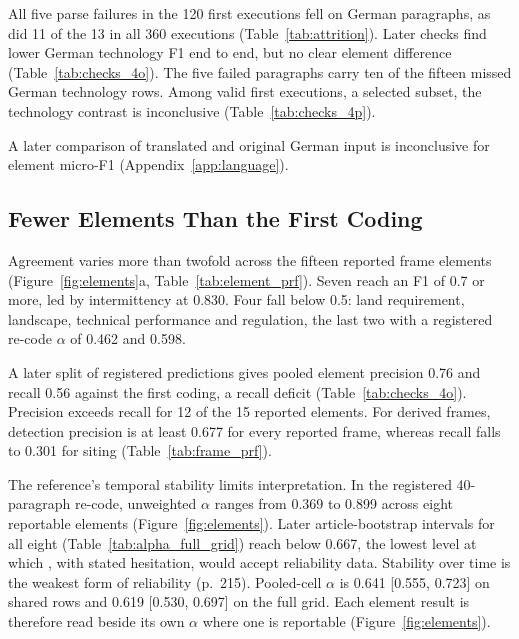 All five parse failures in the 120 first executions fell on German paragraphs, as did 11 of the 13 in all 360 executions (Table~\ref{tab:attrition}). Later checks find lower German technology F1 end to end, but no clear element difference (Table~\ref{tab:checks_4o}). The five failed paragraphs carry ten of the fifteen missed German technology rows. Among valid first executions, a selected subset, the technology contrast is inconclusive (Table~\ref{tab:checks_4p}).

A later comparison of translated and original German input is inconclusive for element micro-F1 (Appendix~\ref{app:language}).

\subsection{Fewer Elements Than the First Coding}\label{subsec:directional}\label{subsubsec:per_element}

Agreement varies more than twofold across the fifteen reported frame elements (Figure~\ref{fig:elements}a, Table~\ref{tab:element_prf}). Seven reach an F1 of 0.7 or more, led by intermittency at 0.830. Four fall below 0.5: land requirement, landscape, technical performance and regulation, the last two with a registered re-code $\alpha$ of 0.462 and 0.598.



\label{subsubsec:error_decomposition}%
A later split of registered predictions gives pooled element precision 0.76 and recall 0.56 against the first coding, a recall deficit (Table~\ref{tab:checks_4o}). Precision exceeds recall for 12 of the 15 reported elements. For derived frames, detection precision is at least 0.677 for every reported frame, whereas recall falls to 0.301 for siting (Table~\ref{tab:frame_prf}).

\label{subsec:reliability_results}%
The reference's temporal stability limits interpretation. In the registered 40-paragraph re-code, unweighted $\alpha$ ranges from 0.369 to 0.899 across eight reportable elements (Figure~\ref{fig:elements}). Later article-bootstrap intervals for all eight (Table~\ref{tab:alpha_full_grid}) reach below 0.667, the lowest level at which \textcite[p.~242]{krippendorff2004contentanalysis}, with stated hesitation, would accept reliability data. Stability over time is the weakest form of reliability (p.~215). Pooled-cell $\alpha$ is 0.641 [0.555, 0.723] on shared rows and 0.619 [0.530, 0.697] on the full grid. Each element result is therefore read beside its own $\alpha$ where one is reportable (Figure~\ref{fig:elements}).

